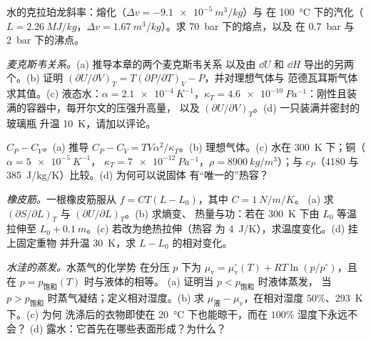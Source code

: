 \begin{exercise}[$\star$]\label{exo:b2:thermodynamic-potentials:4}
水的克拉珀龙斜率：熔化（$\Delta v = -\qty{9.1e-5}{m^3/kg}$）与
在 \qty{100}{\celsius} 下的汽化（$L = \qty{2.26}{MJ/kg}$，$\Delta v =
\qty{1.67}{m^3/kg}$）。求 \qty{70}{bar} 下的熔点，以及
在 \qty{0.7}{bar} 与 \qty{2}{bar} 下的沸点。
\end{exercise}

\begin{exercise}[$\star\star$]\label{exo:b2:thermodynamic-potentials:5}
\emph{麦克斯韦关系。}(a) 推导本章的两个麦克斯韦关系
以及由 $\dd U$ 和 $\dd H$ 导出的另两个。(b) 证明 $(\partial U/\partial V)_T =
T(\partial P/\partial T)_V - P$，并对理想气体与
范德瓦耳斯气体求其值。(c) 液态水：$\alpha = \qty{2.1e-4}{K^{-1}}$，$\kappa_T =
\qty{4.6e-10}{Pa^{-1}}$：刚性且装满的容器中，每开尔文的压强升高量，
以及 $(\partial U/\partial V)_T$。(d) 一只装满并密封的玻璃瓶
升温 \qty{10}{K}，请加以评论。
\end{exercise}

\begin{exercise}[$\star\star$]\label{exo:b2:thermodynamic-potentials:6}
\emph{$C_P - C_V$。}(a) 推导 $C_P - C_V = TV\alpha^2/\kappa_T$。(b)
理想气体。(c) 水在 \qty{300}{K} 下；铜（$\alpha = \qty{5e-5}{K^{-1}}$，
$\kappa_T = \qty{7e-12}{Pa^{-1}}$，$\rho = \qty{8900}{kg/m^3}$）；与
$c_P$（\qty{4180}{} 与 \qty{385}{J/kg/K}）比较。(d) 为何可以说固体
有“唯一的”热容？
\end{exercise}

\begin{exercise}[$\star\star$]\label{exo:b2:thermodynamic-potentials:7}
\emph{橡皮筋。}一根橡皮筋服从 $f = CT(L - L_0)$，其中 $C = \qty{1}{N/m/K}$。
(a) 求 $(\partial S/\partial L)_T$ 与 $(\partial U/\partial L)_T$。(b) 求熵变、
热量与功：若在 \qty{300}{K} 下由
$L_0$ 等温拉伸至 $L_0 + \qty{0.1}{m}$。(c) 若改为绝热拉伸（热容
为 \qty{4}{J/K}），求温度变化。(d) 挂上固定重物
并升温 \qty{30}{K}，求 $L - L_0$ 的相对变化。
\end{exercise}

\begin{exercise}[$\star\star$]\label{exo:b2:thermodynamic-potentials:8}
\emph{水洼的蒸发。}水蒸气的化学势
在分压 $p$ 下为 $\mu_{\text{v}} = \mu_{\text{v}}^\circ(T) +
RT\ln(p/p^\circ)$，且在 $p = p_{\text{饱和}}(T)$ 时与液体的相等。
(a) 证明当 $p < p_{\text{饱和}}$ 时液体蒸发，
当 $p > p_{\text{饱和}}$ 时蒸气凝结；定义相对湿度。(b)
求 $\mu_{\text{液}} - \mu_{\text{v}}$，在相对湿度 $50\%$、\qty{293}{K} 下。(c) 为何
洗涤后的衣物即使在 \qty{20}{\celsius} 下也能晾干，而在 $100\%$ 湿度下永远不会？
(d) 露水：它首先在哪些表面形成？为什么？
\end{exercise}

